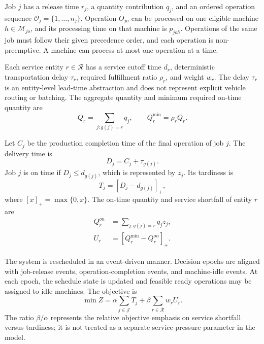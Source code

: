 \documentclass[a4paper,fleqn]{cas-sc}
\begin{document}
Job \(j\) has a release time \(r_j\), a quantity contribution \(q_j\), and an ordered operation sequence \(\mathcal O_j=\{1,\ldots,n_j\}\). Operation \(O_{jo}\) can be processed on one eligible machine \(h\in\mathcal M_{jo}\), and its processing time on that machine is \(p_{joh}\). Operations of the same job must follow their given precedence order, and each operation is non-preemptive. A machine can process at most one operation at a time.

Each service entity \(r\in\mathcal R\) has a service cutoff time \(d_r\), deterministic transportation delay \(\tau_r\), required fulfillment ratio \(\rho_r\), and weight \(w_r\). The delay \(\tau_r\) is an entity-level lead-time abstraction and does not represent explicit vehicle routing or batching. The aggregate quantity and minimum required on-time quantity are
\begin{equation}
Q_r=\sum_{j:g(j)=r}q_j,
\qquad
Q_r^{\min}=\rho_rQ_r.
\label{eq:quantity_requirement}
\end{equation}

Let \(C_j\) be the production completion time of the final operation of job \(j\). The delivery time is
\begin{equation}
D_j=C_j+\tau_{g(j)}.
\label{eq:delivery_time}
\end{equation}
Job \(j\) is on time if \(D_j\le d_{g(j)}\), which is represented by \(z_j\). Its tardiness is
\begin{equation}
T_j=[D_j-d_{g(j)}]_+,
\label{eq:tardiness_definition}
\end{equation}
where \([x]_+=\max\{0,x\}\). The on-time quantity and service shortfall of entity \(r\) are
\begin{align}
Q_r^{on}&=\sum_{j:g(j)=r}q_jz_j,
\label{eq:on_time_quantity}\\
U_r&=[Q_r^{\min}-Q_r^{on}]_+.
\label{eq:shortfall_definition}
\end{align}

The system is rescheduled in an event-driven manner. Decision epochs are aligned with job-release events, operation-completion events, and machine-idle events. At each epoch, the schedule state is updated and feasible ready operations may be assigned to idle machines. The objective is
\begin{equation}
\min Z=\alpha\sum_{j\in\mathcal J}T_j+\beta\sum_{r\in\mathcal R}w_rU_r.
\label{eq:objective}
\end{equation}
The ratio \(\beta/\alpha\) represents the relative objective emphasis on service shortfall versus tardiness; it is not treated as a separate service-pressure parameter in the model.
\end{document}
